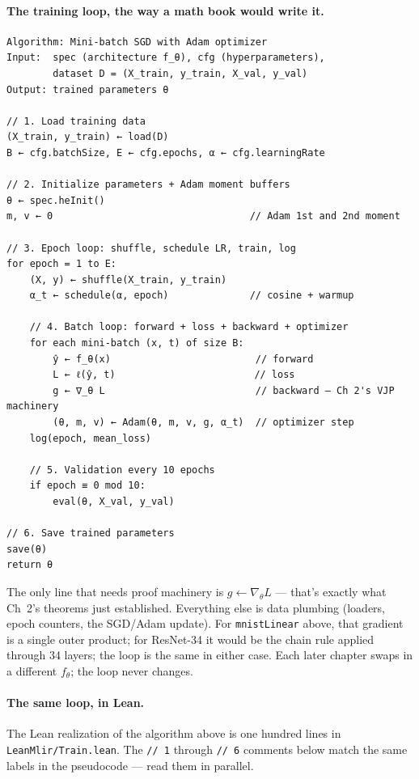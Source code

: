 \paragraph{The training loop, the way a math book would write it.}
\begin{verbatim}
Algorithm: Mini-batch SGD with Adam optimizer
Input:  spec (architecture f_θ), cfg (hyperparameters),
        dataset D = (X_train, y_train, X_val, y_val)
Output: trained parameters θ

// 1. Load training data
(X_train, y_train) ← load(D)
B ← cfg.batchSize, E ← cfg.epochs, α ← cfg.learningRate

// 2. Initialize parameters + Adam moment buffers
θ ← spec.heInit()
m, v ← 0                                  // Adam 1st and 2nd moment

// 3. Epoch loop: shuffle, schedule LR, train, log
for epoch = 1 to E:
    (X, y) ← shuffle(X_train, y_train)
    α_t ← schedule(α, epoch)              // cosine + warmup

    // 4. Batch loop: forward + loss + backward + optimizer
    for each mini-batch (x, t) of size B:
        ŷ ← f_θ(x)                         // forward
        L ← ℓ(ŷ, t)                        // loss
        g ← ∇_θ L                          // backward — Ch 2's VJP machinery
        (θ, m, v) ← Adam(θ, m, v, g, α_t)  // optimizer step
    log(epoch, mean_loss)

    // 5. Validation every 10 epochs
    if epoch ≡ 0 mod 10:
        eval(θ, X_val, y_val)

// 6. Save trained parameters
save(θ)
return θ
\end{verbatim}

The only line that needs proof machinery is
\(g \leftarrow \nabla_\theta L\) --- that's exactly what Ch~2's
theorems just established. Everything else is data plumbing
(loaders, epoch counters, the SGD/Adam update). For
\texttt{mnistLinear} above, that gradient is a single outer product;
for ResNet-34 it would be the chain rule applied through 34 layers;
the loop is the same in either case. Each later chapter swaps in a
different \(f_\theta\); the loop never changes.

\paragraph{The same loop, in Lean.}
The Lean realization of the algorithm above is one hundred lines
in \texttt{LeanMlir/Train.lean}. The \texttt{// 1} through
\texttt{// 6} comments below match the same labels in the
pseudocode --- read them in parallel.

